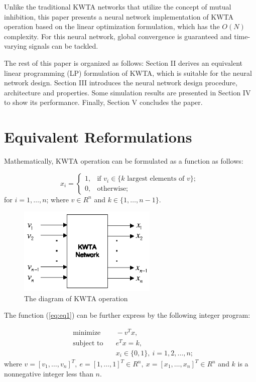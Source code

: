 \documentclass[conference]{IEEEtran}
\begin{document}
Unlike the traditional KWTA networks that utilize the concept of
mutual inhibition, this paper presents a neural network
implementation of KWTA operation based on the linear optimization
formulation, which has the $O(N)$ complexity. For this neural
network, global convergence is guaranteed and time-varying signals
can be tackled.

The rest of this paper is organized as follows: Section II derives
an equivalent linear programming (LP) formulation of KWTA, which is
suitable for the neural network design. Section III introduces the
neural network design procedure, architecture and properties. Some
simulation results are presented in Section IV to show its
performance. Finally, Section V concludes the paper.


\section{Equivalent Reformulations}

Mathematically, KWTA operation can be formulated as a function as
follows:

\begin{equation}
x_i=\left\{ \begin{array}{ll} 1, & \textrm{if $v_i$$\in$\{$k$ largest elements of $v$\}; }\\
0, & \textrm{otherwise;}\end{array}\right. \label{eq:eq1}
\end{equation} for $i=1,\ldots,n$; where $v\in R^{n}$ and $k\in
\{1,\ldots,n-1 \}$.

\begin{figure}[htp]
\centerline{\includegraphics[width=2.6in]{KWTA.eps}} \caption{The
diagram of KWTA operation} \label{fig_sim}
\end{figure}

The function (\ref{eq:eq1}) can be further express by the following
integer program:

\begin{equation}
\begin{array}{lll}
&\mbox{minimize}&\quad -v^{T}x,\\
&\mbox{subject to}&\quad e^{T}x=k, \\
&\mbox{}&\quad x_i\in\{0,1\},\   i=1,2,\ldots ,n;
\end{array}
\label{eq:eq2}
\end{equation}
where $v=[v_1,\ldots,v_n]^{T},\ e=[1,\ldots,1]^{T}\in R^{n},\
x=[x_1,\ldots,x_n]^{T}\in R^{n}$ and $k$ is a nonnegative integer
less than $n$.
\end{document}
